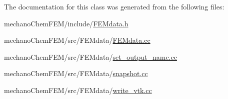 The documentation for this class was generated from the following files\+:\begin{DoxyCompactItemize}
\item 
mechano\+Chem\+F\+E\+M/include/\mbox{\hyperlink{_f_e_mdata_8h}{F\+E\+Mdata.\+h}}\item 
mechano\+Chem\+F\+E\+M/src/\+F\+E\+Mdata/\mbox{\hyperlink{_f_e_mdata_8cc}{F\+E\+Mdata.\+cc}}\item 
mechano\+Chem\+F\+E\+M/src/\+F\+E\+Mdata/\mbox{\hyperlink{set__output__name_8cc}{set\+\_\+output\+\_\+name.\+cc}}\item 
mechano\+Chem\+F\+E\+M/src/\+F\+E\+Mdata/\mbox{\hyperlink{snapshot_8cc}{snapshot.\+cc}}\item 
mechano\+Chem\+F\+E\+M/src/\+F\+E\+Mdata/\mbox{\hyperlink{write__vtk_8cc}{write\+\_\+vtk.\+cc}}\end{DoxyCompactItemize}
